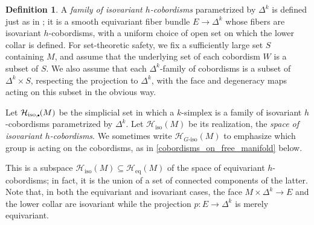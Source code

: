 \documentclass[11pt]{amsart}
\theoremstyle{definition}
\newtheorem{defn}{Definition}[section]
\numberwithin{equation}{section}
\numberwithin{figure}{section}
\newcommand{\mc}{\mathcal}
\newcommand{\Hiso}{\mathcal{H}_{\iso}}
\newcommand{\iso}{\mathrm{iso}}
\newcommand{\eq}{\mathrm{eq}}
\newcommand{\dashiso}{\textrm{-}\mathrm{iso}}
\newcommand{\sbt}{\,\begin{picture}(-1,1)(0.5,-1)\circle*{1.8}\end{picture}\hspace{.05cm}}
\newcommand{\ourdefn}[1]{{\it #1}}
\begin{document}
\begin{defn}\label{hcob_space} A \ourdefn{family of isovariant $h$-cobordisms} parametrized by $\Delta^k$ is defined just as in \cite[Def 4.8]{GIMM1}; it is a smooth equivariant fiber bundle $E \to \Delta^k$ whose fibers are isovariant $h$-cobordisms, with a uniform choice of open set on which the lower collar is defined. 
%
%
%
For set-theoretic safety, we fix a sufficiently large set $S$ containing $M$, and assume that the underlying set of each cobordism $W$ is a subset of $S$. We also assume that each $\Delta^k$-family of cobordisms is a subset of $\Delta^k \times S$, respecting the projection to $\Delta^k$, with the face and degeneracy maps acting on this subset in the obvious way.

Let $\mc H_{\iso,\sbt}(M)$ be the simplicial set in which a $k$-simplex is a family of isovariant $h$-cobordisms parametrized by $\Delta^k$. Let $\mc H_{\iso}(M)$ be its realization, the \ourdefn{space of isovariant $h$-cobordisms}. We sometimes write $\mc H_{G\dashiso}(M)$ to emphasize which group is acting on the cobordisms, as in \autoref{cobordisms_on_free_manifold} below. 

This is a subspace $\Hiso(M) \subseteq \mc H_{\eq}(M)$ of the space of equivariant $h$-cobordisms; in fact, it is the union of a set of connected components of the latter. Note that, in both the equivariant and isovariant cases, the face $M \times \Delta^k \to E$ and the lower collar are isovariant while the projection $p\colon E \to \Delta^k$ is merely equivariant.
\end{defn}
\end{document}
